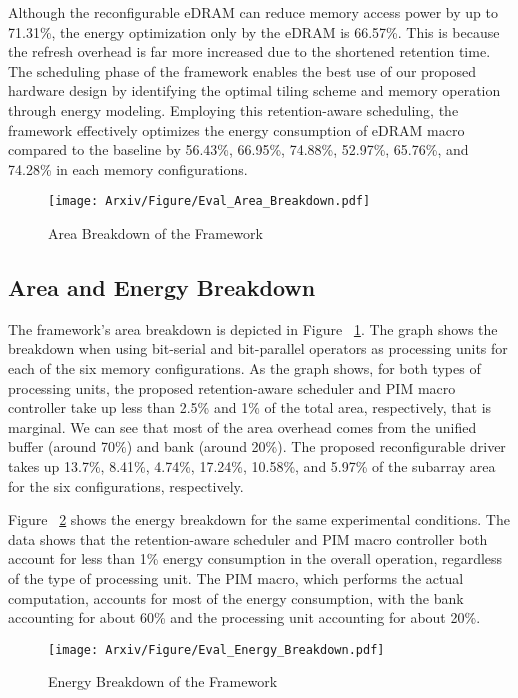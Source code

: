 Although the reconfigurable eDRAM can reduce memory access power by up to 71.31\%, the energy optimization only by the eDRAM is 66.57\%. This is because the refresh overhead is far more increased due to the shortened retention time. The scheduling phase of the \sysname framework enables the best use of our proposed hardware design by identifying the optimal tiling scheme and memory operation through energy modeling. Employing this retention-aware scheduling, the \sysname framework effectively optimizes the energy consumption of eDRAM macro compared to the baseline by 56.43\%, 66.95\%, 74.88\%, 52.97\%, 65.76\%, and 74.28\% in each memory configurations.

\begin{figure}[t]
\centering
\texttt{[image: Arxiv/Figure/Eval\_Area\_Breakdown.pdf]}
\caption{Area Breakdown of the \sysname Framework}
\label{figure_area_breakdown}
\end{figure}

\subsection{Area and Energy Breakdown}
The \sysname framework's area breakdown is depicted in Figure ~\ref{figure_area_breakdown}. The graph shows the breakdown when using bit-serial and bit-parallel operators as processing units for each of the six memory configurations. As the graph shows, for both types of processing units, the proposed retention-aware scheduler and PIM macro controller take up less than 2.5\% and 1\% of the total area, respectively, that is marginal. We can see that most of the area overhead comes from the unified buffer (around 70\%) and bank (around 20\%). The proposed reconfigurable driver takes up 13.7\%, 8.41\%, 4.74\%, 17.24\%, 10.58\%, and 5.97\% of the subarray area for the six configurations, respectively.

Figure ~\ref{figure_energy_breakdown} shows the energy breakdown for the same experimental conditions. The data shows that the retention-aware scheduler and PIM macro controller both account for less than 1\% energy consumption in the overall operation, regardless of the type of processing unit. The PIM macro, which performs the actual computation, accounts for most of the energy consumption, with the bank accounting for about 60\% and the processing unit accounting for about 20\%.

\begin{figure}[t]
\centering
\texttt{[image: Arxiv/Figure/Eval\_Energy\_Breakdown.pdf]}
\caption{Energy Breakdown of the \sysname Framework}
\vspace{-0.1in}
\label{figure_energy_breakdown}
\end{figure}